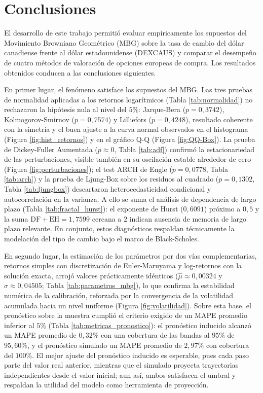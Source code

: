 \documentclass{article}
\begin{document}
\section*{Conclusiones}
El desarrollo de este trabajo permitió evaluar empíricamente los supuestos del Movimiento Browniano Geométrico (MBG) sobre la tasa de cambio del dólar canadiense frente al dólar estadounidense (DEXCAUS) y comparar el desempeño de cuatro métodos de valoración de opciones europeas de compra. Los resultados obtenidos conducen a las conclusiones siguientes.

En primer lugar, el fenómeno satisface los supuestos del MBG. Las tres pruebas de normalidad aplicadas a los retornos logarítmicos (Tabla \ref{tab:normalidad}) no rechazaron la hipótesis nula al nivel del $5\%$: Jarque-Bera ($p=0{,}3742$), Kolmogorov-Smirnov ($p=0{,}7574$) y Lilliefors ($p=0{,}4248$), resultado coherente con la simetría y el buen ajuste a la curva normal observados en el histograma (Figura \ref{fig:hist_retornos}) y en el gráfico Q-Q (Figura \ref{fig:QQ-Box}). La prueba de Dickey-Fuller Aumentada ($p\approx 0$, Tabla \ref{tab:adf}) confirmó la estacionariedad de las perturbaciones, visible también en su oscilación estable alrededor de cero (Figura \ref{fig:perturbaciones}); el test ARCH de Engle ($p=0{,}0778$, Tabla \ref{tab:arch}) y la prueba de Ljung-Box sobre los residuos al cuadrado ($p=0{,}1302$, Tabla \ref{tab:ljungbox}) descartaron heterocedasticidad condicional y autocorrelación en la varianza. A ello se suma el análisis de dependencia de largo plazo (Tabla \ref{tab:fractal_hurst}): el exponente de Hurst ($0{,}6091$) próximo a $0{,}5$ y la suma $\text{DF}+\text{EH}=1{,}7599$ cercana a $2$ indican ausencia de memoria de largo plazo relevante. En conjunto, estos diagnósticos respaldan técnicamente la modelación del tipo de cambio bajo el marco de Black-Scholes.

En segundo lugar, la estimación de los parámetros por dos vías complementarias, retornos simples con discretización de Euler-Maruyama y log-retornos con la solución exacta, arrojó valores prácticamente idénticos (\(\widehat{\mu}\approx 0{,}00324\) y \(\widehat{\sigma}\approx 0{,}04505\); Tabla \ref{tab:parametros_mbg}), lo que confirma la estabilidad numérica de la calibración, reforzada por la convergencia de la volatilidad acumulada hacia un nivel uniforme (Figura \ref{fig:volatilidad}). Sobre esta base, el pronóstico sobre la muestra cumplió el criterio exigido de un MAPE promedio inferior al $5\%$ (Tabla \ref{tab:metricas_pronostico}): el pronóstico inducido alcanzó un MAPE promedio de $0{,}32\%$ con una cobertura de las bandas al $95\%$ de $95{,}60\%$, y el pronóstico simulado un MAPE promedio de $2{,}97\%$ con cobertura del $100\%$. El mejor ajuste del pronóstico inducido es esperable, pues cada paso parte del valor real anterior, mientras que el simulado proyecta trayectorias independientes desde el valor inicial; aun así, ambos satisfacen el umbral y respaldan la utilidad del modelo como herramienta de proyección.
\end{document}
